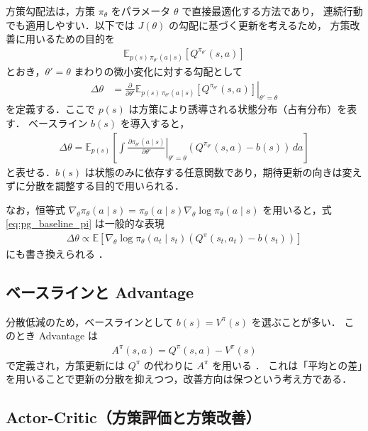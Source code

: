 方策勾配法は，方策 $\pi_\theta$ をパラメータ $\theta$ で直接最適化する方法であり，
連続行動でも適用しやすい．以下では $J(\theta)$ の勾配に基づく更新を考えるため，
方策改善に用いるための目的を
\begin{align}
  \mathbb{E}_{p(s)\,\pi_{\theta'}(a\mid s)}\left[Q^{\pi_{\theta'}}(s,a)\right]
\end{align}
とおき，$\theta'=\theta$ まわりの微小変化に対する勾配として
\begin{align}
  \Delta \theta
   & =
  \left.
  \frac{\partial}{\partial \theta'}
  \mathbb{E}_{p(s)\,\pi_{\theta'}(a\mid s)}\left[Q^{\pi_{\theta'}}(s,a)\right]
  \right|_{\theta'=\theta}
  \label{eq:pg_start}
\end{align}
を定義する．ここで $p(s)$ は方策により誘導される状態分布（占有分布）を表す．
ベースライン $b(s)$ を導入すると，
\begin{align}
  \Delta \theta
  =
  \mathbb{E}_{p(s)}\left[
  \int
  \left.\frac{\partial \pi_{\theta'}(a\mid s)}{\partial \theta'}\right|_{\theta'=\theta}
  \left(Q^{\pi_{\theta'}}(s,a)-b(s)\right)\,da
  \right]
  \label{eq:pg_baseline_pi}
\end{align}
と表せる．$b(s)$ は状態のみに依存する任意関数であり，期待更新の向きは変えずに分散を調整する目的で用いられる．

なお，恒等式
$\nabla_\theta \pi_\theta(a\mid s)=\pi_\theta(a\mid s)\nabla_\theta\log\pi_\theta(a\mid s)$
を用いると，式 \eqref{eq:pg_baseline_pi} は一般的な表現
\begin{align}
  \Delta\theta
  \propto
  \mathbb{E}\left[\nabla_\theta\log\pi_\theta(a_t\mid s_t)\left(Q^\pi(s_t,a_t)-b(s_t)\right)\right]
  \label{eq:pg_log_form}
\end{align}
にも書き換えられる \cite{sutton2000policy}．

\subsection{ベースラインと Advantage}
\label{subsec:baseline_adv}

分散低減のため，ベースラインとして $b(s)=V^\pi(s)$ を選ぶことが多い．
このとき Advantage は
\begin{align}
  A^\pi(s,a)=Q^\pi(s,a)-V^\pi(s)
  \label{eq:adv_def}
\end{align}
で定義され，方策更新には $Q^\pi$ の代わりに $A^\pi$ を用いる \cite{sutton2000policy, barto1983neuronlike}．
これは「平均との差」を用いることで更新の分散を抑えつつ，改善方向は保つという考え方である．

\subsection{Actor-Critic（方策評価と方策改善）}
\label{subsec:actor_critic}

